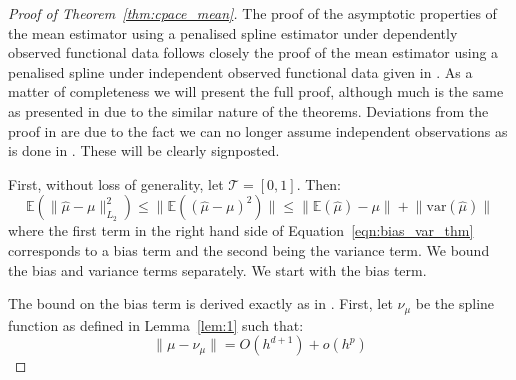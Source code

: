 \begin{proof}[Proof of Theorem~\ref{thm:cpace_mean}]
	The proof of the asymptotic properties of the mean estimator using a penalised spline estimator under dependently observed functional data follows closely the proof of the mean estimator using a penalised spline under independent observed functional data given in \citep{xiao_asymptotic_2020}.
	As a matter of completeness we will present the full proof, although much is the same as presented in \citep{xiao_asymptotic_2020} due to the similar nature of the theorems.
	Deviations from the proof in \citep{xiao_asymptotic_2020} are due to the fact we can no longer assume independent observations as is done in \citep{xiao_asymptotic_2020}.
	These will be clearly signposted. 
	
	First, without loss of generality, let $\mathcal{T} = \left[0, 1\right]$.
	Then:
	\begin{equation}
		\mathbb{E} \left(\lVert \hat{\mu} - \mu \rVert_{L_2}^2 \right) \leq \lVert \mathbb{E}\left( \left(\hat{\mu} - \mu \right)^2 \right) \rVert \leq \lVert \mathbb{E}\left(\hat{\mu}\right) - \mu \rVert + \lVert \text{var}\left(\hat{\mu}\right)\rVert
		\label{eqn:bias_var_thm}
	\end{equation}
where the first term in the right hand side of Equation~\eqref{eqn:bias_var_thm} corresponds to a bias term and the second being the variance term.
We bound the bias and variance terms separately.
We start with the bias term. 

The bound on the bias term is derived exactly as in \citep{xiao_asymptotic_2020}. 
First, let $\nu_\mu$ be the spline function as defined in Lemma~\ref{lem:1} such that: 
\begin{equation}
		\lVert \mu - \nu_\mu \rVert = O\left( h^{d+1} \right) + o(h^{p})
		\label{eqn:cpace_mu_nu_bound}
\end{equation}


\end{proof}
